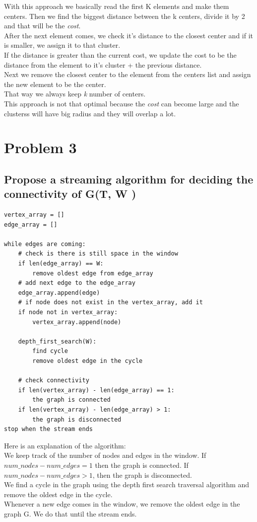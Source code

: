 \documentclass[11pt]{article}
\begin{document}
With this approach we basically read the first K elements and make them centers. Then we find the biggest distance between the k centers, divide it by 2 and that will be the \textit{cost}. \\
After the next element comes, we check it's distance to the closest center and if it is smaller, we assign it to that cluster. \\
If the distance is greater than the current cost, we update the cost to be the distance from the element to it's cluster + the previous distance. \\
Next we remove the closest center to the element from the centers list and assign the new element to be the center. \\
That way we always keep  \textit{k} number of centers. \\
This approach is not that optimal because the \textit{cost} can become large and the clusterss will have big radius and they will overlap a lot.

\section{Problem 3}
\subsection{Propose a streaming algorithm for deciding the connectivity of G(T, W )}

\begin{lstlisting}
vertex_array = []
edge_array = []

while edges are coming:
	# check is there is still space in the window
	if len(edge_array) == W:
		remove oldest edge from edge_array
	# add next edge to the edge_array
	edge_array.append(edge)
	# if node does not exist in the vertex_array, add it
	if node not in vertex_array:
		vertex_array.append(node)

	depth_first_search(W):
		find cycle
		remove oldest edge in the cycle

	# check connectivity
	if len(vertex_array) - len(edge_array) == 1:
		the graph is connected
	if len(vertex_array) - len(edge_array) > 1:
		the graph is disconnected
stop when the stream ends
\end{lstlisting}

Here is an explanation of the algorithm: \\
We keep track of the number of nodes and edges in the window. If $ num\_nodes - num\_edges = 1 $ then the graph is connected. If $ num\_nodes - num\_edges > 1 $, then the graph is disconnected. \\
We find a cycle in the graph using the depth first search traversal algorithm and remove the oldest edge in the cycle. \\
Whenever a new edge comes in the window, we remove the oldest edge in the graph G. We do that until the stream ends.
\end{document}
